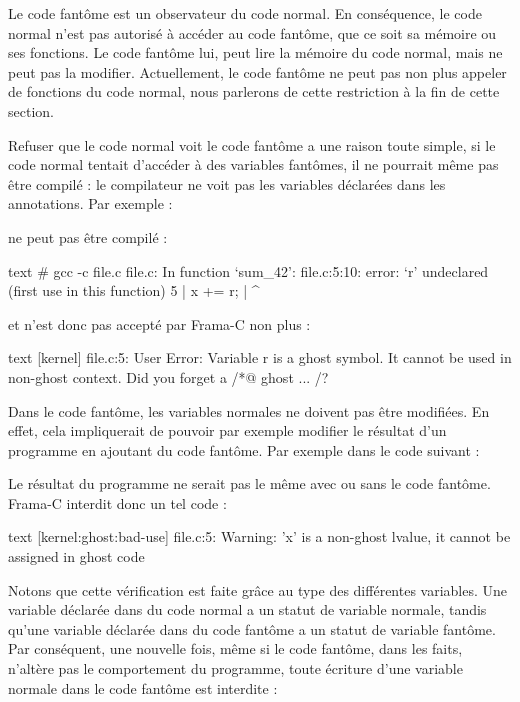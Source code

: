 

Le code fantôme est un observateur du code normal. En conséquence, le code normal
n'est pas autorisé à accéder au code fantôme, que ce soit sa mémoire ou ses
fonctions. Le code fantôme lui, peut lire la mémoire du code normal, mais ne peut
pas la modifier. Actuellement, le code fantôme ne peut pas non plus appeler de
fonctions du code normal, nous parlerons de cette restriction à la fin de cette
section.


Refuser que le code normal voit le code fantôme a une raison toute simple, si le
code normal tentait d'accéder à des variables fantômes, il ne pourrait même pas
être compilé : le compilateur ne voit pas les variables déclarées dans les
annotations. Par exemple :




ne peut pas être compilé :


\begin{CodeBlock}{text}
# gcc -c file.c
file.c: In function ‘sum_42’:
file.c:5:10: error: ‘r’ undeclared (first use in this function)
    5 |     x += r;
      |          ^
\end{CodeBlock}


et n'est donc pas accepté par Frama-C non plus :


\begin{CodeBlock}{text}
[kernel] file.c:5: User Error:
  Variable r is a ghost symbol. It cannot be used in non-ghost context. Did you forget a /*@ ghost ... /?
\end{CodeBlock}


Dans le code fantôme, les variables normales ne doivent pas être modifiées. En effet,
cela impliquerait de pouvoir par exemple modifier le résultat d'un programme en
ajoutant du code fantôme. Par exemple dans le code suivant :




Le résultat du programme ne serait pas le même avec ou sans le code fantôme.
Frama-C interdit donc un tel code :


\begin{CodeBlock}{text}
[kernel:ghost:bad-use] file.c:5: Warning:
  'x' is a non-ghost lvalue, it cannot be assigned in ghost code
\end{CodeBlock}


Notons que cette vérification est faite grâce au type des différentes variables.
Une variable déclarée dans du code normal a un statut de variable normale, tandis
qu'une variable déclarée dans du code fantôme a un statut de variable fantôme.
Par conséquent, une nouvelle fois, même si le code fantôme, dans les faits,
n'altère pas le comportement du programme, toute écriture d'une variable normale
dans le code fantôme est interdite :


